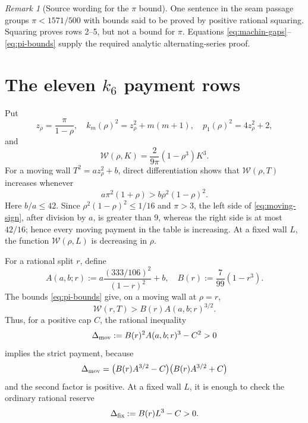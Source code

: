 \documentclass[11pt]{article}
\theoremstyle{remark}
\newtheorem{remark}[lemma]{Remark}
\newcommand{\Weyl}{\mathcal W}
\begin{document}
\begin{remark}[Source wording for the $\pi$ bound]
One sentence in the seam passage groups $\pi<1571/500$ with bounds said
to be proved by positive rational squaring.  Squaring proves rows 2--5,
but not a bound for $\pi$.  Equations \eqref{eq:machin-gaps}--
\eqref{eq:pi-bounds} supply the required analytic alternating-series
proof.
\end{remark}

\section{The eleven \texorpdfstring{$k_6$}{k6} payment rows}

Put
\begin{equation}
 z_\rho=\frac{\pi}{1-\rho},\quad
 k_m(\rho)^2=z_\rho^2+m(m+1),\quad
 p_1(\rho)^2=4z_\rho^2+2,
 \label{eq:walls}
\end{equation}
and
\begin{equation}
 \Weyl(\rho,K)=\frac{2}{9\pi}(1-\rho^3)K^3.
 \label{eq:W}
\end{equation}
For a moving wall $T^2=az_\rho^2+b$, direct differentiation shows that
$\Weyl(\rho,T)$ increases whenever
\begin{equation}
 a\pi^2(1+\rho)>b\rho^2(1-\rho)^2.
 \label{eq:moving-sign}
\end{equation}
Here $b/a\leq42$.  Since
$\rho^2(1-\rho)^2\leq1/16$ and $\pi>3$, the left side of
\eqref{eq:moving-sign}, after division by $a$, is greater than $9$,
whereas the right side is at most $42/16$; hence every moving payment in
the table is increasing.  At a fixed wall $L$, the function
$\Weyl(\rho,L)$ is decreasing in $\rho$.

For a rational split $r$, define
\begin{equation}
 A(a,b;r):=a\frac{(333/106)^2}{(1-r)^2}+b,\quad
 B(r):=\frac7{99}(1-r^3).
 \label{eq:AB}
\end{equation}
The bounds \eqref{eq:pi-bounds} give, on a moving wall at $\rho=r$,
\begin{equation}
 \Weyl(r,T)>B(r)A(a,b;r)^{3/2}.
 \label{eq:moving-lower}
\end{equation}
Thus, for a positive cap $C$, the rational inequality
\begin{equation}
 \Delta_{\rm mov}:=B(r)^2A(a,b;r)^3-C^2>0
 \label{eq:moving-reserve}
\end{equation}
implies the strict payment, because
\[
 \Delta_{\rm mov}
 =\bigl(B(r)A^{3/2}-C\bigr)
  \bigl(B(r)A^{3/2}+C\bigr)
\]
and the second factor is positive.  At a fixed wall $L$, it is enough to
check the ordinary rational reserve
\begin{equation}
 \Delta_{\rm fix}:=B(r)L^3-C>0.
 \label{eq:fixed-reserve}
\end{equation}
\end{document}
